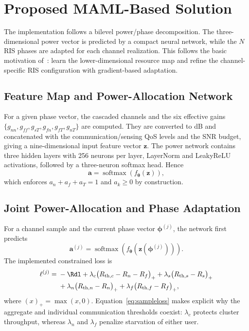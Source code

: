 \section{Proposed MAML-Based Solution}
The implementation follows a bilevel power/phase decomposition. The
three-dimensional power vector is predicted by a compact neural network, while
the $N$ RIS phases are adapted for each channel realization. This follows the
basic motivation of~\cite{zou2023ml}: learn the lower-dimensional resource map
and refine the channel-specific RIS configuration with gradient-based
adaptation.

\subsection{Feature Map and Power-Allocation Network}\label{sec:feat}
For a given phase vector, the cascaded channels and the six effective gains
$\{g_{nn},g_{ff},g_{sT},g_{fn},g_{fT},g_{nT}\}$ are computed. They are converted
to dB and concatenated with the communication/sensing QoS levels and the SNR
budget, giving a nine-dimensional input feature vector $\bm z$. The power
network contains three hidden layers with 256 neurons per layer, LayerNorm and
LeakyReLU activations, followed by a three-neuron softmax head. Hence
\begin{equation}
\bm a=\operatorname{softmax}(f_{\bm\theta}(\bm z)),
\end{equation}
which enforces $a_n+a_f+a_T=1$ and $a_k\geq0$ by construction.

\subsection{Joint Power-Allocation and Phase Adaptation}
For a channel sample and the current phase vector $\bm\phi^{(j)}$, the network
first predicts
\begin{equation}
\bm a^{(j)}=\operatorname{softmax}
\left(f_{\bm\theta}(\bm z(\bm\phi^{(j)}))\right). \label{eq:powerpred}
\end{equation}
The implemented constrained loss is
\begin{align}
\ell^{(j)}={}&-\Rdl
+\lambda_c\big(R_{\mathrm{th},c}-R_n-R_f\big)_+
+\lambda_s\big(R_{\mathrm{th},s}-R_s\big)_+ \notag\\
&+\lambda_n\big(R_{\mathrm{th},n}-R_n\big)_+
+\lambda_f\big(R_{\mathrm{th},f}-R_f\big)_+, \label{eq:sampleloss}
\end{align}
where $(x)_+=\max(x,0)$. Equation~\eqref{eq:sampleloss} makes explicit why the
aggregate and individual communication thresholds coexist: $\lambda_c$ protects
cluster throughput, whereas $\lambda_n$ and $\lambda_f$ penalize starvation of
either user.

